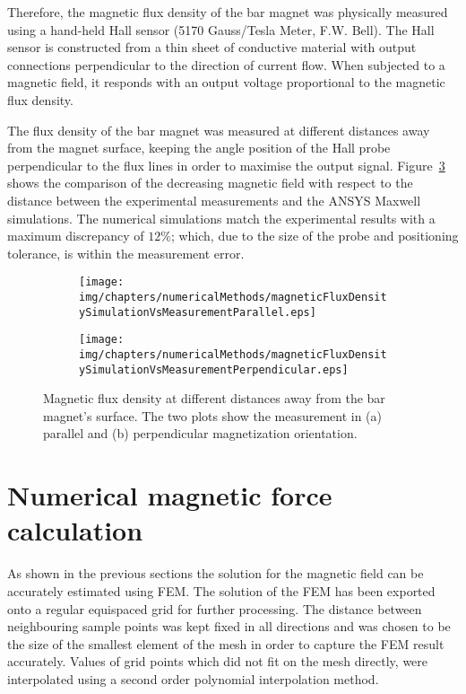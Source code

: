 Therefore, the magnetic flux density of the bar magnet was physically measured using a hand-held Hall sensor (5170 Gauss/Tesla Meter, F.W. Bell). The Hall sensor is constructed from a thin sheet of conductive material with output connections perpendicular to the direction of current flow. When subjected to a magnetic field, it responds with an output voltage proportional to the magnetic flux density.

The flux density of the bar magnet was measured at different distances away from the magnet surface, keeping the angle position of the Hall probe perpendicular to the flux lines in order to maximise the output signal. Figure~\ref{fig:magneticFluxDensitySimulationVsMeasurement} shows the comparison of the decreasing magnetic field with respect to the distance between the experimental measurements and the ANSYS Maxwell simulations. The numerical simulations match the experimental results with a maximum discrepancy of $12\%$; which, due to the size of the probe and positioning tolerance, is within the measurement error.

\begin{figure}[htb]
        \centering
        \begin{subfigure}[b]{0.47\textwidth}
                \texttt{[image: img/chapters/numericalMethods/magneticFluxDensitySimulationVsMeasurementParallel.eps]}
                \caption{}
                \label{fig:magneticFluxDensityParallel}
        \end{subfigure}
        \begin{subfigure}[b]{0.47\textwidth}
                \texttt{[image: img/chapters/numericalMethods/magneticFluxDensitySimulationVsMeasurementPerpendicular.eps]}
                \caption{}
                \label{fig:magneticFluxDensityPerpendicular}
        \end{subfigure}
        \caption[Measured magnetic flux density of a bar magnet]{Magnetic flux density at different distances away from the bar magnet's surface. The two plots show the measurement in (a) parallel and (b) perpendicular magnetization orientation.}
        \label{fig:magneticFluxDensitySimulationVsMeasurement}
\end{figure}


\section{Numerical magnetic force calculation}\label{sec:numericalMagneticForceCalcualtion}
As shown in the previous sections the solution for the magnetic field can be accurately estimated using FEM. The solution of the FEM has been exported onto a regular equispaced grid for further processing. The distance between neighbouring sample points was kept fixed in all directions and was chosen to be the size of the smallest element of the mesh in order to capture the FEM result accurately. Values of grid points which did not fit on the mesh directly, were interpolated using a second order polynomial interpolation method.

